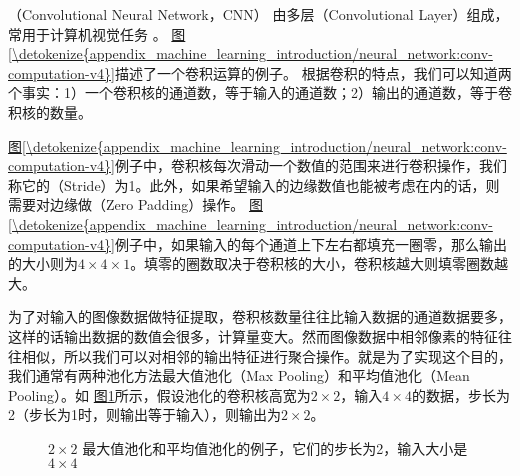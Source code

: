 \documentclass[letterpaper,10pt,english]{sphinxmanual}
\let\sphinxpxdimen\pdfpxdimen\else\newdimen\sphinxpxdimen
\begin{document}
\sphinxAtStartPar
{} （Convolutional Neural Network，CNN）
由多层（Convolutional
Layer）组成，常用于计算机视觉任务
。
\hyperref[\detokenize{appendix_machine_learning_introduction/neural_network:conv-computation-v4}]{图\ref{\detokenize{appendix_machine_learning_introduction/neural_network:conv-computation-v4}}}描述了一个卷积运算的例子。
根据卷积的特点，我们可以知道两个事实：1）一个卷积核的通道数，等于输入的通道数；2）输出的通道数，等于卷积核的数量。

\sphinxAtStartPar
\hyperref[\detokenize{appendix_machine_learning_introduction/neural_network:conv-computation-v4}]{图\ref{\detokenize{appendix_machine_learning_introduction/neural_network:conv-computation-v4}}}例子中，卷积核每次滑动一个数值的范围来进行卷积操作，我们称它的（Stride）为1。此外，如果希望输入的边缘数值也能被考虑在内的话，则需要对边缘做（Zero
Padding）操作。
\hyperref[\detokenize{appendix_machine_learning_introduction/neural_network:conv-computation-v4}]{图\ref{\detokenize{appendix_machine_learning_introduction/neural_network:conv-computation-v4}}}例子中，如果输入的每个通道上下左右都填充一圈零，那么输出的大小则为\(4\times 4\times 1\)。填零的圈数取决于卷积核的大小，卷积核越大则填零圈数越大。

\sphinxAtStartPar
为了对输入的图像数据做特征提取，卷积核数量往往比输入数据的通道数据要多，这样的话输出数据的数值会很多，计算量变大。然而图像数据中相邻像素的特征往往相似，所以我们可以对相邻的输出特征进行聚合操作。就是为了实现这个目的，我们通常有两种池化方法最大值池化（Max
Pooling）和平均值池化（Mean Pooling）。如
\hyperref[\detokenize{appendix_machine_learning_introduction/neural_network:pooling-v3}]{图\ref{\detokenize{appendix_machine_learning_introduction/neural_network:pooling-v3}}}所示，假设池化的卷积核高宽为\(2\times2\)，输入\(4\times4\)的数据，步长为2（步长为1时，则输出等于输入），则输出为\(2\times2\)。

\begin{figure}[H]
\centering
\capstart

\noindent\sphinxincludegraphics[width=600\sphinxpxdimen]{{pooling_v3}.png}
\caption{\(2 \times 2\)
最大值池化和平均值池化的例子，它们的步长为2，输入大小是\(4 \times 4\)}\label{\detokenize{appendix_machine_learning_introduction/neural_network:id21}}\label{\detokenize{appendix_machine_learning_introduction/neural_network:pooling-v3}}\end{figure}
\end{document}
